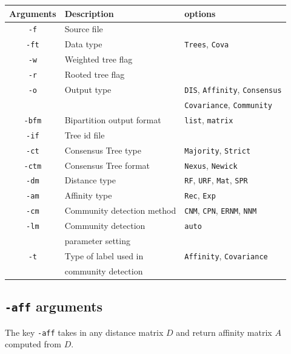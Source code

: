 \documentclass[11pt,a4paper]{article}
\theoremstyle{definition}
\theoremstyle{definition}
\numberwithin{equation}{section}
\begin{document}
	\begin{table}[!h]
		\centering
		\begin{tabular}{cll}
			\hline
			Arguments & Description & options\\
			\hline
			\texttt{-f}& Source file &  \\
			\hline
			\texttt{-ft}& Data type & \texttt{Trees}, \texttt{Cova}\\
			\hline
			\texttt{-w}& Weighted tree flag&\\
			\hline
			\texttt{-r}& Rooted tree flag& \\
			\hline
			\texttt{-o}& Output type & \texttt{DIS}, \texttt{Affinity}, \texttt{Consensus}\\
			&&\texttt{Covariance}, \texttt{Community}\\
			\hline
			\texttt{-bfm}& Bipartition output format & \texttt{list}, \texttt{matrix}\\
			\hline
			\texttt{-if}& Tree id file&\\
			\hline
			\texttt{-ct}& Consensus Tree type& \texttt{Majority}, \texttt{Strict}\\
			\hline
			\texttt{-ctm}& Consensus Tree format& \texttt{Nexus}, \texttt{Newick}\\
			\hline
			\texttt{-dm}& Distance type& \texttt{RF}, \texttt{URF}, \texttt{Mat}, \texttt{SPR}\\
			\hline
			\texttt{-am}& Affinity type& \texttt{Rec}, \texttt{Exp}\\
			\hline
			\texttt{-cm}& Community detection method& \texttt{CNM}, \texttt{CPN}, \texttt{ERNM}, \texttt{NNM}\\
			\hline
			\texttt{-lm}& Community detection & \texttt{auto}\\
			& parameter setting&\\
			\hline
			\texttt{-t}& Type of label used in & \texttt{Affinity}, \texttt{Covariance}\\
			& community detection&\\
			\hline
		\end{tabular}
	\end{table}
	
	\clearpage
	
	\subsection{\texttt{-aff} arguments}
	
	The key \texttt{-aff} takes in any distance matrix $D$ and return affinity matrix $A$ computed from $D$.
	
\end{document}
